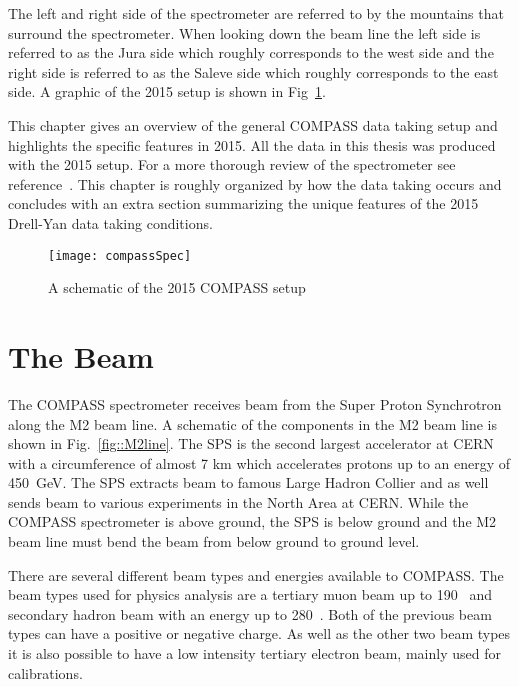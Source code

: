 The left and right side of the spectrometer are referred to by the mountains
that surround the spectrometer.  When looking down the beam line the left side
is referred to as the Jura side which roughly corresponds to the west side and
the right side is referred to as the Saleve side which roughly corresponds to
the east side.  A graphic of the 2015 setup is shown in
Fig~\ref{fig::compassSpec}.\par

This chapter gives an overview of the general COMPASS data taking setup and
highlights the specific features in 2015.  All the data in this thesis was
produced with the 2015 setup.  For a more thorough review of the spectrometer
see reference~\cite{compassSpec}.  This chapter is roughly organized by how the
data taking occurs and concludes with an extra section summarizing the unique
features of the 2015 Drell-Yan data taking conditions. \par

\begin{figure}[h!t]
  \centering
  \texttt{[image: compassSpec]}
  \caption{A schematic of the 2015 COMPASS setup}
  \label{fig::compassSpec}
\end{figure}

\section{The Beam}
The COMPASS spectrometer receives beam from the Super Proton Synchrotron along
the M2 beam line.  A schematic of the components in the M2 beam line is shown in
Fig.~\ref{fig::M2line}.  The SPS is the second largest accelerator at CERN with
a circumference of almost 7 km which accelerates protons up to an energy of
450~GeV.  The SPS extracts beam to famous Large Hadron Collier and as well sends
beam to various experiments in the North Area at CERN.  While the COMPASS
spectrometer is above ground, the SPS is below ground and the M2 beam line must
bend the beam from below ground to ground level. \par

There are several different beam types and energies available to COMPASS.  The
beam types used for physics analysis are a tertiary muon beam up to 190~{\gvc}
and secondary hadron beam with an energy up to 280~{\gvc}.  Both of the previous
beam types can have a positive or negative charge.  As well as the other two
beam types it is also possible to have a low intensity tertiary electron beam,
mainly used for calibrations. \par

